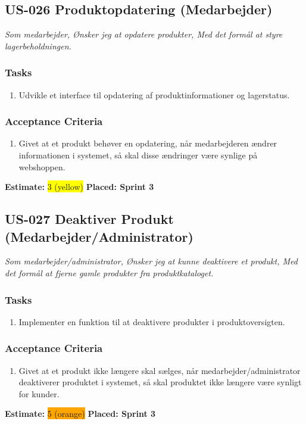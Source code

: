 \subsection{US-026 Produktopdatering (Medarbejder)}
\label{sec:US-026}
\textit{Som medarbejder, Ønsker jeg at opdatere produkter, Med det formål at styre lagerbeholdningen.}
\subsubsection*{\textbf{Tasks}}
\begin{enumerate}
  \item Udvikle et interface til opdatering af produktinformationer og lagerstatus.
\end{enumerate}
\subsubsection*{\textbf{Acceptance Criteria}}
\begin{enumerate}
  \item Givet at et produkt behøver en opdatering, når medarbejderen ændrer informationen i systemet, så skal disse ændringer være synlige på webshoppen.
\end{enumerate}
\textbf{Estimate:} \colorbox{yellow}{3 (yellow)}
\textbf{Placed: Sprint 3}
\par\noindent\dotfill

\subsection{US-027 Deaktiver Produkt (Medarbejder/Administrator)}
\label{sec:US-027}
\textit{Som medarbejder/administrator, Ønsker jeg at kunne deaktivere et produkt, Med det formål at fjerne gamle produkter fra produktkataloget.}
\subsubsection*{\textbf{Tasks}}
\begin{enumerate}
  \item Implementer en funktion til at deaktivere produkter i produktoversigten.
\end{enumerate}
\subsubsection*{\textbf{Acceptance Criteria}}
\begin{enumerate}
  \item Givet at et produkt ikke længere skal sælges, når medarbejder/administrator deaktiverer produktet i systemet, så skal produktet ikke længere være synligt for kunder.
\end{enumerate}
\textbf{Estimate:} \colorbox{orange}{5 (orange)}
\textbf{Placed: Sprint 3}
\par\noindent\dotfill


